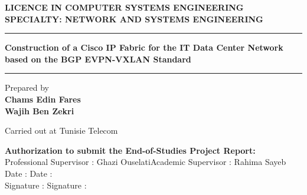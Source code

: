 \thispagestyle{empty}
\centering
\hspace{0.6cm}\logoISTIC \hspace{0.68cm} \logoMinistereISTIC \hspace{0.6cm}\logoCarthage

\vspace{1.8cm}

\textbf{LICENCE IN COMPUTER SYSTEMS ENGINEERING} \\[0.2cm]
\textbf{SPECIALTY: NETWORK AND SYSTEMS ENGINEERING}

\vspace{1.4cm}

\noindent\rule{\textwidth}{0.8pt}
\vspace{0.5cm}

{\large \color{blue} \bfseries Construction of a Cisco IP Fabric for the IT Data Center Network based on the BGP EVPN-VXLAN Standard}

\vspace{0.5cm}
\noindent\rule{\textwidth}{0.8pt}

\vspace{1.0cm}

{\large Prepared by} \\[0.2cm]
{\Large \bfseries Chams Edin Fares \\[0.3cm] Wajih Ben Zekri}

\vspace{1.2cm}

{\large Carried out at Tunisie Telecom \par \vspace{0.4cm} \logoTELECOM}
\vspace{1.2cm}

\begin{minipage}{0.9\textwidth}
\noindent
\small
{\normalsize \bfseries Authorization to submit the End-of-Studies Project Report:}\\[0.2cm]
Professional Supervisor : Ghazi Ouselati\quad\quad\quad\quad\quad Academic Supervisor : Rahima Sayeb \\[0.35cm]
Date : \dotfill \quad\quad\quad  Date : \dotfill \\[0.35cm]
Signature : \dotfill \quad\quad\quad Signature : \dotfill
\end{minipage}

\vfill
